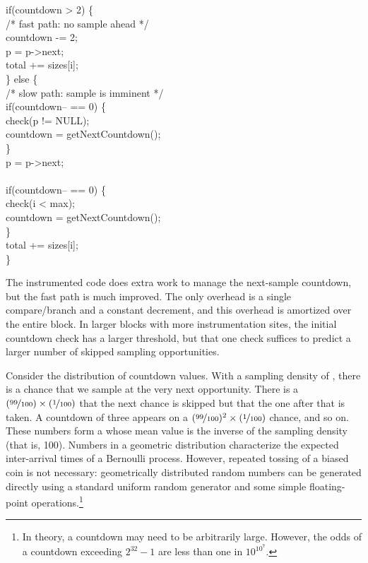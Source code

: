 \begin{code}
  if(countdown > 2) \{ \\
  \> /* fast path: no sample ahead */ \\
  \> countdown -= 2; \\
  \> \up p = p->next; \\
  \> \up total += sizes[i]; \\
  \} else \{ \\
  \> /* slow path: sample is imminent */ \\
  \> if(countdown-- == 0) \{ \\
  \>\> check(p != NULL); \\
  \>\> countdown = getNextCountdown(); \\
  \> \} \\
  \> \up p = p->next; \\
  \> \\
  \> if(countdown-- == 0) \{ \\
  \>\> check(i < max); \\
  \>\> countdown = getNextCountdown(); \\
  \> \} \\
  \> \up total += sizes[i]; \\
  \}
\end{code}

The instrumented code does extra work to manage the
next-sample countdown, but the fast path is much improved.  The only
overhead is a single compare/branch and a constant decrement, and this
overhead is amortized over the entire block.  In larger blocks with
more instrumentation sites, the initial countdown check has a larger
threshold, but that one check suffices to predict a larger number of
skipped sampling opportunities.

Consider the distribution of countdown values.  With a sampling
density of , there is a  chance that
we sample at the very next opportunity.  There is a
$(\nicefrac{99}{100}) \times (\nicefrac{1}{100})$ that the next chance
is skipped but that the one after that is taken.  A countdown of three
appears on a $(\nicefrac{99}{100})^2 \times (\nicefrac{1}{100})$
chance, and so on.  These numbers form a  whose mean value is the inverse of the sampling
density (that is, 100).  Numbers in a geometric distribution
characterize the expected inter-arrival times of a Bernoulli process.
However, repeated tossing of a biased coin is not necessary:
geometrically distributed random numbers can be generated directly
using a standard uniform random generator and some simple
floating-point operations.\footnote{In theory, a countdown may need to
  be arbitrarily large.  However, the odds of a 
  countdown exceeding $2^{32}-1$ are less than one in $10^{10^7}$.}

